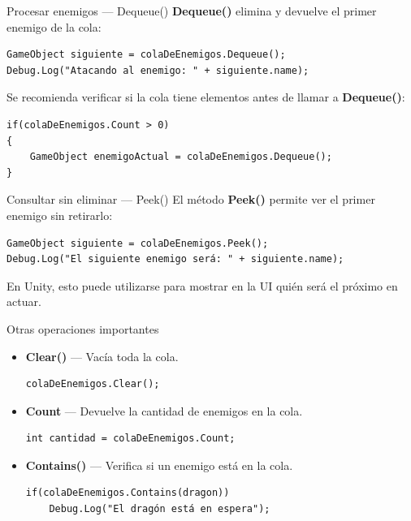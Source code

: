 \documentclass{beamer}
\begin{document}
\begin{frame}[fragile]{Procesar enemigos — Dequeue()}
\lstset{style=CSharpStyle}
\textbf{Dequeue()} elimina y devuelve el primer enemigo de la cola:
\begin{lstlisting}
GameObject siguiente = colaDeEnemigos.Dequeue();
Debug.Log("Atacando al enemigo: " + siguiente.name);
\end{lstlisting}

Se recomienda verificar si la cola tiene elementos antes de llamar a \textbf{Dequeue()}:
\begin{lstlisting}
if(colaDeEnemigos.Count > 0)
{
    GameObject enemigoActual = colaDeEnemigos.Dequeue();
}
\end{lstlisting}
\end{frame}

\begin{frame}[fragile]{Consultar sin eliminar — Peek()}
\lstset{style=CSharpStyle}
El método \textbf{Peek()} permite ver el primer enemigo sin retirarlo:
\begin{lstlisting}
GameObject siguiente = colaDeEnemigos.Peek();
Debug.Log("El siguiente enemigo será: " + siguiente.name);
\end{lstlisting}

En Unity, esto puede utilizarse para mostrar en la UI quién será el próximo en actuar.
\end{frame}

\begin{frame}[fragile]{Otras operaciones importantes}
\begin{itemize}
    \item \textbf{Clear()} — Vacía toda la cola.
\begin{lstlisting}
colaDeEnemigos.Clear();
\end{lstlisting}

    \item \textbf{Count} — Devuelve la cantidad de enemigos en la cola.
\begin{lstlisting}
int cantidad = colaDeEnemigos.Count;
\end{lstlisting}

    \item \textbf{Contains()} — Verifica si un enemigo está en la cola.
\begin{lstlisting}
if(colaDeEnemigos.Contains(dragon))
    Debug.Log("El dragón está en espera");
\end{lstlisting}
\end{itemize}
\end{frame}
\end{document}
